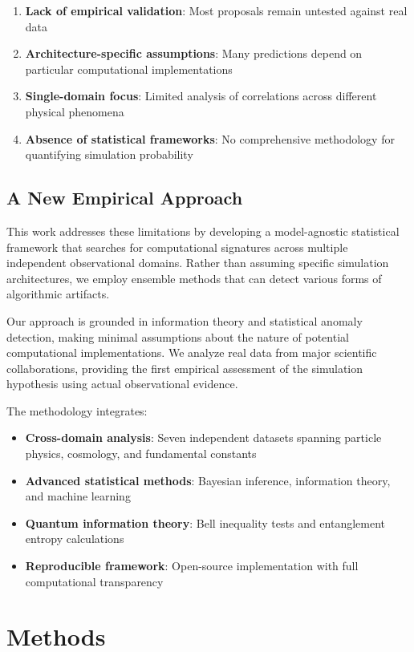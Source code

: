 \documentclass[12pt,a4paper]{article}
\begin{document}
\begin{enumerate}
\item \textbf{Lack of empirical validation}: Most proposals remain untested against real data
\item \textbf{Architecture-specific assumptions}: Many predictions depend on particular computational implementations  
\item \textbf{Single-domain focus}: Limited analysis of correlations across different physical phenomena
\item \textbf{Absence of statistical frameworks}: No comprehensive methodology for quantifying simulation probability
\end{enumerate}

\subsection{A New Empirical Approach}

This work addresses these limitations by developing a model-agnostic statistical framework that searches for computational signatures across multiple independent observational domains. Rather than assuming specific simulation architectures, we employ ensemble methods that can detect various forms of algorithmic artifacts.

Our approach is grounded in information theory and statistical anomaly detection, making minimal assumptions about the nature of potential computational implementations. We analyze real data from major scientific collaborations, providing the first empirical assessment of the simulation hypothesis using actual observational evidence.

The methodology integrates:
\begin{itemize}
\item \textbf{Cross-domain analysis}: Seven independent datasets spanning particle physics, cosmology, and fundamental constants
\item \textbf{Advanced statistical methods}: Bayesian inference, information theory, and machine learning
\item \textbf{Quantum information theory}: Bell inequality tests and entanglement entropy calculations  
\item \textbf{Reproducible framework}: Open-source implementation with full computational transparency
\end{itemize}

\section{Methods}
\end{document}
